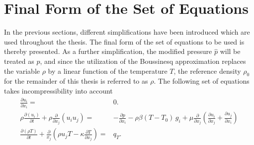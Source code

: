 \section{Final Form of the Set of Equations}

In the previous sections, different simplifications have been introduced which are used throughout the thesis. The final form of the set of equations to be used is thereby presented. As a further simplification, the modified pressure \(\hat{p}\) will be treated as \(p\), and since the utilization of the Boussinesq approximation replaces the variable \(\rho\) by a linear function of the temperature \(T\), the reference density \(\rho_0\) for the remainder of this thesis is referred to as \(\rho\). The following set of equations takes incompressibility into account
\begin{subequations}
\label{eq:completeset}
\begin{align}
\label{eq:contidiff}
\frac{\partial u_i}{\partial x_i} =& 0. \\[1em]
\label{eq:momentumdiff}
\rho \frac{\partial \left( u_i \right)}{\partial t} 
+ \rho \frac{\partial}{\partial x_j} \left( u_i  u_j \right) 
=& - \frac{\partial p}{\partial x_i} 
- \rho \beta \left( T - T_0 \right)\, g_i
+  \mu \frac{\partial}{\partial x_j} \left( \frac{\partial u_i}{\partial x_j} 
+ \frac{\partial u_j}{\partial x_i} \right) \\[1em]
\label{eq:temperaturediff}
\frac{\partial \left(\rho T \right)}{\partial t} + \frac{\partial}{x_j} \left( \rho u_j T - \kappa \frac{\partial T}{\partial x_j} \right) =& q_T.
\end{align}
\end{subequations}

